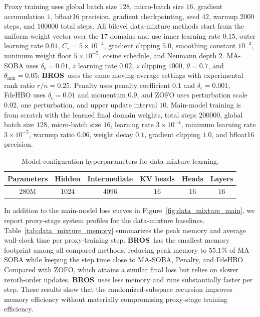 \documentclass{pkumelon}
\theoremstyle{plain}
\newcommand{\oursname}{\textnormal{\textbf{BROS}}}
\newcommand{\ours}{\oursname\ }
\begin{document}
Proxy training uses global batch size $128$, micro-batch size $16$, gradient accumulation $1$, bfloat16 precision, gradient checkpointing, seed $42$, warmup $2000$ steps, and $100000$ total steps. All bilevel data-mixture methods start from the uniform weight vector over the $17$ domains and use inner learning rate $0.15$, outer learning rate $0.01$, $C_r=5\times10^{-4}$, gradient clipping $5.0$, smoothing constant $10^{-3}$, minimum weight floor $5\times10^{-5}$, cosine schedule, and Neumann depth $2$. MA-SOBA uses $\delta_{\epsilon}=0.01$, $z$ learning rate $0.02$, $z$ clipping $1000$, $\theta=0.7$, and $\theta_{\min}=0.05$; \ours uses the same moving-average settings with experimental rank ratio $r/n=0.25$. Penalty uses penalty coefficient $0.1$ and $\delta_{\epsilon}=0.001$, FdeHBO uses $\delta_{\epsilon}=0.01$ and momentum $0.9$, and ZOFO uses perturbation scale $0.02$, one perturbation, and upper update interval $10$. Main-model training is from scratch with the learned final domain weights, total steps $200000$, global batch size $128$, micro-batch size $16$, learning rate $3\times10^{-4}$, minimum learning rate $3\times10^{-5}$, warmup ratio $0.06$, weight decay $0.1$, gradient clipping $1.0$, and bfloat16 precision.

\begin{table}[t!]
\centering
\caption{Model-configuration hyperparameters for data-mixture learning.}
\label{tab:data_mixture_hyperparams}
\small
\setlength{\tabcolsep}{4pt}
\renewcommand{\arraystretch}{1.12}
\begin{threeparttable}
\begin{tabular}{cccccc}
\toprule
Parameters & Hidden & Intermediate & KV heads & Heads & Layers \\
\midrule
$280$M & $1024$ & $4096$ & $16$ & $16$ & $16$ \\
\bottomrule
\end{tabular}
\end{threeparttable}
\end{table}

In addition to the main-model loss curves in Figure~\ref{fig:data_mixture_main}, we report proxy-stage system profiles for the data-mixture baselines. Table~\ref{tab:data_mixture_memory} summarizes the peak memory and average wall-clock time per proxy-training step. \ours has the smallest memory footprint among all compared methods, reducing peak memory to $55.1\%$ of MA-SOBA while keeping the step time close to MA-SOBA, Penalty, and FdeHBO. Compared with ZOFO, which attains a similar final loss but relies on slower zeroth-order updates, \ours uses less memory and runs substantially faster per step. These results show that the randomized-subspace recursion improves memory efficiency without materially compromising proxy-stage training efficiency.
\end{document}
